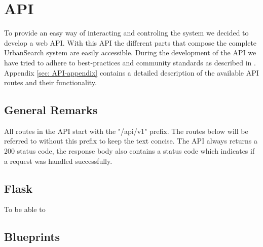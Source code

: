 \section{API}\label{sec: 5-API}
To provide an easy way of interacting and controling the system we decided to develop a web API. With this API the different parts that compose the complete UrbanSearch system are easily accessible. During the development of the API we have tried to adhere to best-practices and community standards as described in \cite{apigee}. Appendix \ref{sec: API-appendix} contains a detailed description of the available API routes and their functionality.

\subsection{General Remarks}

All routes in the API start with the "/api/v1" prefix. The routes below will be referred to without this prefix to keep the text concise. The API always returns a 200 status code, the response body also contains a status code which indicates if a request was handled successfully.

\subsection{Flask}
To be able to 

\subsection{Blueprints}